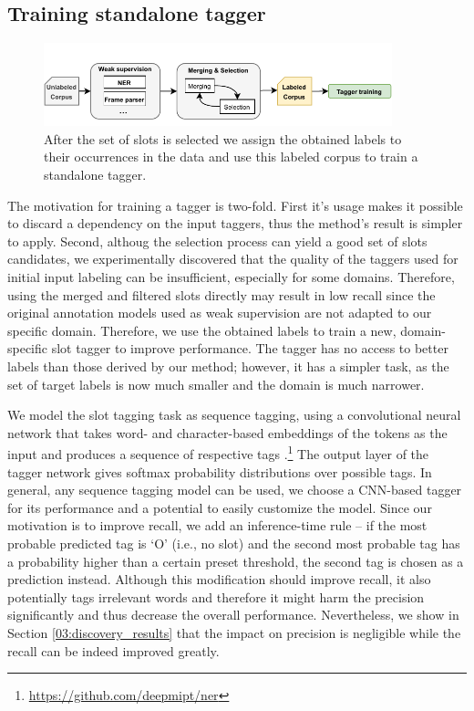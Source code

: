 \subsection{Training standalone tagger}
\label{03:training_tagger}
\begin{figure}[h]
    \centering
    \includegraphics[width=0.9\textwidth]{images/tagging.pdf}
    \caption{After the set of slots is selected we assign the obtained labels to their occurrences in the data and use this labeled corpus to train a standalone tagger. }
    \label{fig:training_tagger}
\end{figure}
The motivation for training a tagger is two-fold.
First it's usage makes it possible to discard a dependency on the input taggers, thus the method's result is simpler to apply. 
Second, althoug the selection process can yield a good set of slots candidates, we experimentally discovered that the quality of the taggers used for initial input labeling can be insufficient, especially for some domains.
Therefore, using the merged and filtered slots directly may result in low recall since the original annotation models used as weak supervision are not adapted to our specific domain.
Therefore, we use the obtained labels to train a new, domain-specific slot tagger to improve performance.
The tagger has no access to better labels than those derived by our method; however, it has a simpler task, as the set of target labels is now much smaller and the domain is much narrower.

We model the slot tagging task as sequence tagging, using a convolutional neural network that takes word- and character-based embeddings of the tokens as the input and produces a sequence of respective tags \cite{lample2016neural}.\footnote{\url{https://github.com/deepmipt/ner}}
The output layer of the tagger network gives softmax probability distributions over possible tags.
In general, any sequence tagging model can be used, we choose a CNN-based tagger for its performance and a potential to easily customize the model.
Since our motivation is to improve recall, we add an inference-time rule -- if the most probable predicted tag is `O' (i.e., no slot) and the second most probable tag has a probability higher than a certain preset threshold, the second tag is chosen as a prediction instead.
Although this modification should improve recall, it also potentially tags irrelevant words and therefore it might harm the precision significantly and thus decrease the overall performance.
Nevertheless, we show in Section \ref{03:discovery_results} that the impact on precision is negligible while the recall can be indeed improved greatly. 

